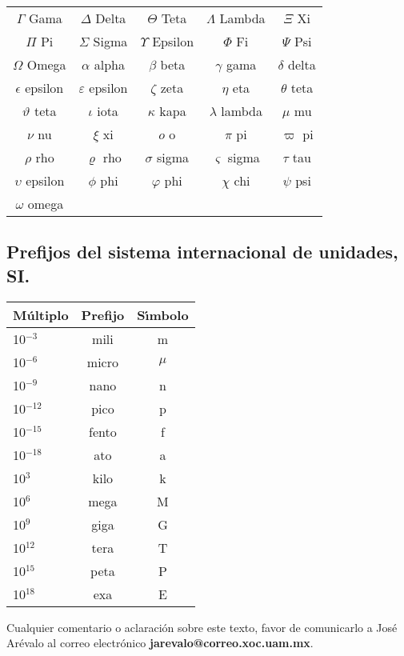 \documentclass[letterpaper,spanish,12pt]{article}
\begin{document}
\begin{center}
\begin{tabular}{ccccc}
 $\Gamma     $ Gama&
 $\Delta     $ Delta&
 $\Theta     $ Teta&
 $\Lambda    $ Lambda&
 $\Xi        $ Xi \\ 
 $\Pi        $ Pi&
 $\Sigma     $ Sigma&
 $\Upsilon   $ Epsilon&
 $\Phi       $ Fi&
 $\Psi       $ Psi \\
 $\Omega     $ Omega & 
 $\alpha     $ alpha &
 $\beta      $ beta&
 $\gamma     $ gama &
 $\delta     $ delta \\
 $\epsilon   $ epsilon &
 $\varepsilon$ epsilon&
 $\zeta      $ zeta&
 $\eta       $ eta&
 $\theta     $ teta \\
 $\vartheta  $ teta &
 $\iota      $ iota &
 $\kappa     $ kapa& 
 $\lambda    $ lambda&
 $\mu        $ mu \\
 $\nu        $ nu &
 $\xi        $ xi&
 $o          $ o&
 $\pi        $ pi&
 $\varpi     $ pi \\
 $\rho       $ rho&
 $\varrho    $ rho&
 $\sigma     $ sigma &
 $\varsigma  $ sigma&
 $\tau       $ tau \\
 $\upsilon   $ epsilon&
 $\phi       $ phi&
 $\varphi    $ phi&
 $\chi       $ chi&
 $\psi       $ psi \\
 $\omega     $ omega &
 $        $ &
 $        $ &
 $        $ &
 $        $ \\
\end{tabular}
\end{center}
\vspace{0.5cm}


\subsection*{Prefijos del sistema internacional de unidades, SI.}

\vspace{0.5cm}
\begin{center}
\begin{tabular}{lcc}
M\'{u}ltiplo & Prefijo & S\'{\i}mbolo \\ \hline
10$^{-3}$ & mili & m \\ 
10$^{-6}$ & micro & $\mu$ \\
10$^{-9}$ & nano & n \\  
10$^{-12}$ & pico & p \\ 
10$^{-15}$ & fento & f \\ 
10$^{-18}$ & ato & a \\ \hline \hline
10$^{3}$ & kilo & k \\ 
10$^{6}$ & mega & M\\   
10$^{9}$ & giga & G\\   
10$^{12}$ & tera & T \\   
10$^{15}$ & peta & P\\   
10$^{18}$ & exa & E \\ \hline
\end{tabular}
\end{center}
\vfill


Cualquier comentario o aclaraci\'{o}n sobre este texto, favor de
comunicarlo a Jos\'{e} Ar\'{e}valo al correo electr\'{o}nico
\textbf{jarevalo@correo.xoc.uam.mx}.
\end{document}
